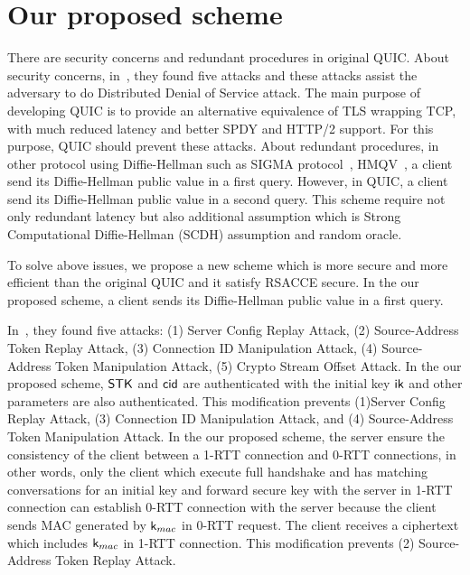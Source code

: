 \section{Our proposed scheme} \label{sec:proposed_scheme}

There are security concerns and redundant procedures in original
QUIC.
About security concerns, in~\cite{LJBN15:QUIC}, they found five
attacks and these attacks assist the adversary to do Distributed
Denial of Service attack.
The main purpose of developing QUIC is to provide an
alternative equivalence of TLS wrapping TCP, with much
reduced latency and better SPDY and HTTP/2 support.
For this purpose, QUIC should prevent these attacks.
About redundant procedures, in other protocol using Diffie-Hellman
such as SIGMA protocol~\cite{Kra03:SIGMA}, HMQV~\cite{Kra05:HQMV},
a client send its Diffie-Hellman public value in a first query. However,
in QUIC, a client send its Diffie-Hellman public value in a second query.
This scheme require not only redundant latency but also additional assumption
 which is Strong Computational Diffie-Hellman (SCDH) assumption and random oracle.

To solve above issues, we propose a new scheme which is more secure and more efficient
than the original QUIC and it satisfy RSACCE secure.
In the our proposed scheme, a client sends its Diffie-Hellman public value in
a first query.

In~\cite{LJBN15:QUIC}, they found five attacks:
(1) Server Config Replay Attack,
(2) Source-Address Token Replay Attack,
(3) Connection ID Manipulation Attack,
(4) Source-Address Token Manipulation Attack,
(5) Crypto Stream Offset Attack.
In the our proposed scheme, $\mathsf{STK}$ and $\mathsf{cid}$ are authenticated with the initial key
$\mathsf{ik}$ and other parameters are also authenticated.
This modification prevents (1)Server Config Replay Attack,
(3) Connection ID Manipulation Attack, and
(4) Source-Address Token Manipulation Attack.
In the our proposed scheme, the server ensure the consistency of the client between
a 1-RTT connection and 0-RTT connections, in other words, only the client which
execute full handshake and has matching conversations for an initial key and forward
secure key with the server in 1-RTT connection can establish 0-RTT connection with
the server because the client sends MAC generated by $\mathsf{k}_{mac}$ in 0-RTT request.
The client receives a ciphertext which includes $\mathsf{k}_{mac}$ in 1-RTT connection.
This modification prevents (2) Source-Address Token Replay Attack.

